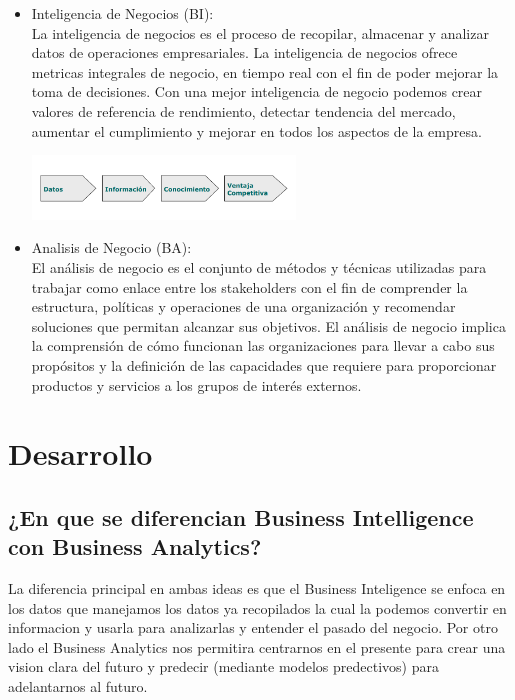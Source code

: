 \documentclass[twoside,twocolumn]{article}
\begin{document}
\begin{itemize}
\item Inteligencia de Negocios (BI): \\ 
La inteligencia de negocios es el proceso de recopilar, almacenar y analizar datos de operaciones empresariales. La inteligencia de negocios ofrece metricas integrales de negocio,
en tiempo real con el fin de poder mejorar la toma de decisiones. Con una mejor inteligencia de negocio podemos crear valores de referencia de rendimiento, detectar tendencia del mercado,
aumentar el cumplimiento y mejorar en todos los aspectos de la empresa.
\begin{center}
	\includegraphics[width=7cm]{./Imagenes/bi} 
\end{center}

\item Analisis de Negocio (BA): \\ 
El análisis de negocio es el conjunto de métodos y técnicas utilizadas para trabajar como enlace entre los stakeholders con el fin de comprender la estructura, políticas y operaciones de una organización y recomendar soluciones que permitan alcanzar sus objetivos. El análisis de negocio implica la comprensión de cómo funcionan las organizaciones para llevar a cabo sus propósitos y la definición de las capacidades que requiere para proporcionar productos y servicios a los grupos de interés externos.

\end{itemize}




\section{Desarrollo}

\subsection{¿En que se diferencian Business Intelligence con Business Analytics?}
La diferencia principal en ambas ideas es que el Business Inteligence se enfoca en los datos que manejamos los datos ya recopilados la cual la podemos convertir en informacion
y usarla para analizarlas y entender el pasado del negocio. Por otro lado el Business Analytics nos permitira centrarnos en el presente para crear una vision clara del futuro y predecir (mediante modelos predectivos) para adelantarnos al futuro.
\end{document}
